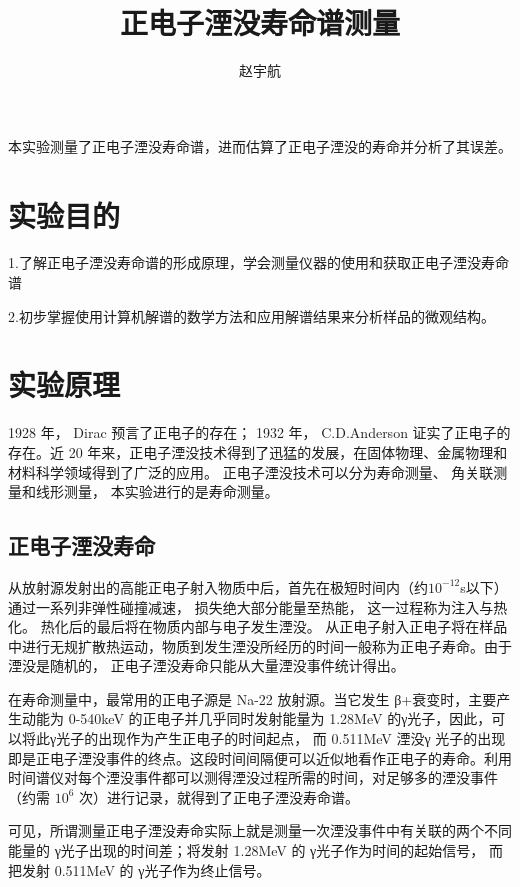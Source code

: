 \documentclass[hyperref]{ctexart}
\title{\textbf{正电子湮没寿命谱测量}}
\author{\sffamily 赵宇航}
\date{}
\begin{document}
\maketitle
{}本实验测量了正电子湮没寿命谱，进而估算了正电子湮没的寿命并分析了其误差。\\	
\begin{multicols}{2}
\section{实验目的}
1.了解正电子湮没寿命谱的形成原理，学会测量仪器的使用和获取正电子湮没寿命谱

2.初步掌握使用计算机解谱的数学方法和应用解谱结果来分析样品的微观结构。
	
\section{实验原理}
1928 年， Dirac 预言了正电子的存在； 1932 年， C.D.Anderson 证实了正电子的存在。近 20 年来，正电子湮没技术得到了迅猛的发展，在固体物理、金属物理和材料科学领域得到了广泛的应用。 正电子湮没技术可以分为寿命测量、 角关联测量和线形测量， 本实验进行的是寿命测量。
\subsection{正电子湮没寿命}
	从放射源发射出的高能正电子射入物质中后，首先在极短时间内（约${10}^{-12}$s以下）通过一系列非弹性碰撞减速， 损失绝大部分能量至热能， 这一过程称为注入与热化。 热化后的最后将在物质内部与电子发生湮没。 从正电子射入正电子将在样品中进行无规扩散热运动，物质到发生湮没所经历的时间一般称为正电子寿命。由于湮没是随机的， 正电子湮没寿命只能从大量湮没事件统计得出。

	在寿命测量中，最常用的正电子源是 Na-22 放射源。当它发生 β+衰变时，主要产生动能为 0-540keV 的正电子并几乎同时发射能量为 1.28MeV 的γ光子，因此，可以将此γ光子的出现作为产生正电子的时间起点， 而 0.511MeV 湮没γ 光子的出现即是正电子湮没事件的终点。这段时间间隔便可以近似地看作正电子的寿命。利用时间谱仪对每个湮没事件都可以测得湮没过程所需的时间，对足够多的湮没事件（约需 ${10}^{6}$ 次）进行记录，就得到了正电子湮没寿命谱。

	可见，所谓测量正电子湮没寿命实际上就是测量一次湮没事件中有关联的两个不同能量的 γ光子出现的时间差；将发射 1.28MeV 的 γ光子作为时间的起始信号， 而把发射 0.511MeV 的 γ光子作为终止信号。

\end{multicols}
\end{document}
